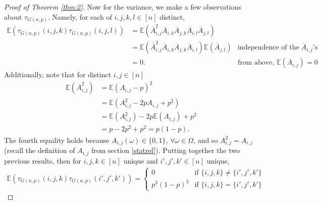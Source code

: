 \documentclass{article}
\begin{document}
\begin{proof}[Proof of Theorem \ref{thm:2}]
Now for the variance, we make a few observations about $\tau_{G(n,p)}$. Namely, for each of $i, j, k, l \in [n]$ distinct,
\begin{align*}
    \mathbb{E}\left(\tau_{G(n,p)}(i, j, k)\tau_{G(n,p)}(i, j, l)\right) &= 
    \mathbb{E}\left(\overline{A}_{i,j}^2\overline{A}_{i,k}\overline{A}_{j,k}\overline{A}_{i,l}\overline{A}_{j,l} \right)\\
    &= \mathbb{E}\left(\overline{A}_{i,j}^2\overline{A}_{i,k}\overline{A}_{j,k}\overline{A}_{i,l}\right) \mathbb{E} \left(\overline{A}_{j,l}\right) & \text{independence of the $\overline{A}_{i,j}$'s}\\
    &= 0. & \text{from above, $\mathbb{E}\left(\overline{A}_{i,j} \right) = 0$}
\end{align*}
Additionally, note that for distinct $i, j \in [n]$
\begin{align*}
    \mathbb{E}\left(\overline{A}_{i,j}^2 \right) &= \mathbb{E}\left(A_{i,j} - p \right)^2\\
    &= \mathbb{E}\left(A_{i,j}^2 - 2pA_{i,j} + p^2\right)\\
    &= \mathbb{E}\left(A_{i,j}^2\right) - 2p\mathbb{E}\left(A_{i,j}\right) + p^2\\
    &= p - 2p^2 + p^2 = p(1-p).
\end{align*}
The fourth equality holds because $A_{i,j}(\omega) \in \{0,1\}$, $\forall \omega \in \Omega$, and so $A_{i,j}^2 = A_{i,j}$ (recall the definition of $A_{i,j}$ from section \ref{statref}). Putting together the two previous results, then for $i, j, k \in [n]$ unique and $i', j', k' \in [n]$ unique,
\begin{align}
 \mathbb{E} \left( \tau_{G(n,p)}(i,j,k) \tau_{G(n,p)}(i',j',k') \right) = 
    \begin{cases}
        0 & \text{if $\{i,j,k\} \neq \{i',j',k'\}$}\\
        p^3(1-p)^3 & \text{if $\{i,j,k\} = \{i',j',k'\}$} \label{eq9}
   \end{cases}
\end{align}


\end{proof}
\end{document}
